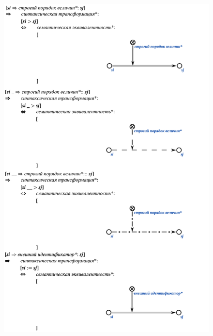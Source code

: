 \newpage
\begin{figure}[h]
	\includegraphics[scale=0.5]{images/intro/scs/sc.s-connectors/examples/example_3.png}
\end{figure}

